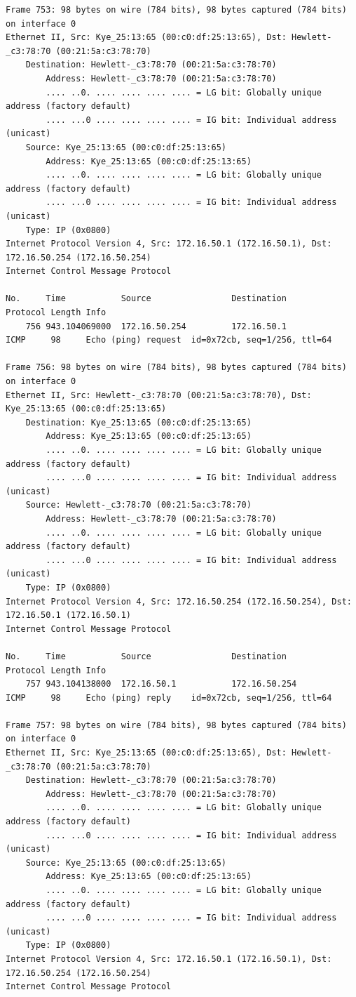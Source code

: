 \documentclass[a4paper,11pt]{article}
\begin{document}
\begin{lstlisting}
Frame 753: 98 bytes on wire (784 bits), 98 bytes captured (784 bits) on interface 0
Ethernet II, Src: Kye_25:13:65 (00:c0:df:25:13:65), Dst: Hewlett-_c3:78:70 (00:21:5a:c3:78:70)
    Destination: Hewlett-_c3:78:70 (00:21:5a:c3:78:70)
        Address: Hewlett-_c3:78:70 (00:21:5a:c3:78:70)
        .... ..0. .... .... .... .... = LG bit: Globally unique address (factory default)
        .... ...0 .... .... .... .... = IG bit: Individual address (unicast)
    Source: Kye_25:13:65 (00:c0:df:25:13:65)
        Address: Kye_25:13:65 (00:c0:df:25:13:65)
        .... ..0. .... .... .... .... = LG bit: Globally unique address (factory default)
        .... ...0 .... .... .... .... = IG bit: Individual address (unicast)
    Type: IP (0x0800)
Internet Protocol Version 4, Src: 172.16.50.1 (172.16.50.1), Dst: 172.16.50.254 (172.16.50.254)
Internet Control Message Protocol

No.     Time           Source                Destination           Protocol Length Info
    756 943.104069000  172.16.50.254         172.16.50.1           ICMP     98     Echo (ping) request  id=0x72cb, seq=1/256, ttl=64

Frame 756: 98 bytes on wire (784 bits), 98 bytes captured (784 bits) on interface 0
Ethernet II, Src: Hewlett-_c3:78:70 (00:21:5a:c3:78:70), Dst: Kye_25:13:65 (00:c0:df:25:13:65)
    Destination: Kye_25:13:65 (00:c0:df:25:13:65)
        Address: Kye_25:13:65 (00:c0:df:25:13:65)
        .... ..0. .... .... .... .... = LG bit: Globally unique address (factory default)
        .... ...0 .... .... .... .... = IG bit: Individual address (unicast)
    Source: Hewlett-_c3:78:70 (00:21:5a:c3:78:70)
        Address: Hewlett-_c3:78:70 (00:21:5a:c3:78:70)
        .... ..0. .... .... .... .... = LG bit: Globally unique address (factory default)
        .... ...0 .... .... .... .... = IG bit: Individual address (unicast)
    Type: IP (0x0800)
Internet Protocol Version 4, Src: 172.16.50.254 (172.16.50.254), Dst: 172.16.50.1 (172.16.50.1)
Internet Control Message Protocol

No.     Time           Source                Destination           Protocol Length Info
    757 943.104138000  172.16.50.1           172.16.50.254         ICMP     98     Echo (ping) reply    id=0x72cb, seq=1/256, ttl=64

Frame 757: 98 bytes on wire (784 bits), 98 bytes captured (784 bits) on interface 0
Ethernet II, Src: Kye_25:13:65 (00:c0:df:25:13:65), Dst: Hewlett-_c3:78:70 (00:21:5a:c3:78:70)
    Destination: Hewlett-_c3:78:70 (00:21:5a:c3:78:70)
        Address: Hewlett-_c3:78:70 (00:21:5a:c3:78:70)
        .... ..0. .... .... .... .... = LG bit: Globally unique address (factory default)
        .... ...0 .... .... .... .... = IG bit: Individual address (unicast)
    Source: Kye_25:13:65 (00:c0:df:25:13:65)
        Address: Kye_25:13:65 (00:c0:df:25:13:65)
        .... ..0. .... .... .... .... = LG bit: Globally unique address (factory default)
        .... ...0 .... .... .... .... = IG bit: Individual address (unicast)
    Type: IP (0x0800)
Internet Protocol Version 4, Src: 172.16.50.1 (172.16.50.1), Dst: 172.16.50.254 (172.16.50.254)
Internet Control Message Protocol


\end{lstlisting}
\end{document}

